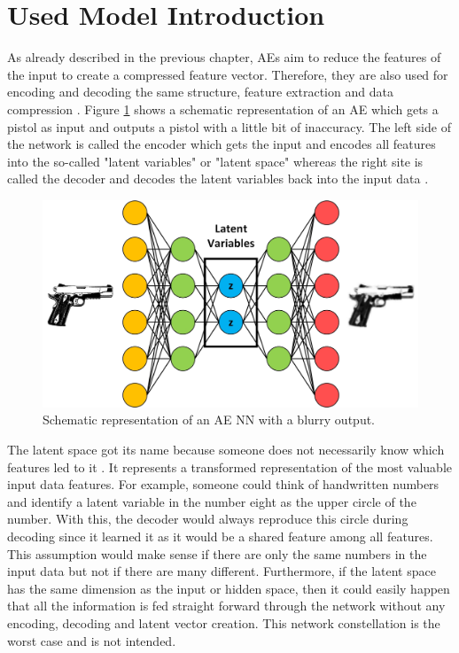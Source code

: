 \documentclass[MGS,Master,english]{twbook}%
\begin{document}
\section{Used Model Introduction}
As already described in the previous chapter, \acp{AE} aim to reduce the features of the input to create a compressed feature vector. Therefore, they are also used for encoding and decoding the same structure, feature extraction and data compression \cite{ml::book::nnProgrammingTF}. Figure \ref{fig::autoencoder} shows a schematic representation of an \ac{AE} which gets a pistol as input and outputs a pistol with a little bit of inaccuracy. The left side of the network is called the encoder which gets the input and encodes all features into the so-called "latent variables" or "latent space" whereas the right site is called the decoder and decodes the latent variables back into the input data \cite{ml::book::nnProgrammingTF}. 
\begin{figure}[!htbp]
	\centering
	\includegraphics[width=0.9\linewidth]{PICs/NNs/autoencoder}
	\caption{Schematic representation of an \ac{AE} \ac{NN} with a blurry output.} \label{fig::autoencoder}
\end{figure}

The latent space got its name because someone does not necessarily know which features led to it \cite{ml::vae::tutorial}. It represents a transformed representation of the most valuable input data features. For example, someone could think of handwritten numbers and identify a latent variable in the number eight as the upper circle of the number. With this, the decoder would always reproduce this circle during decoding since it learned it as it would be a shared feature among all features. This assumption would make sense if there are only the same numbers in the input data but not if there are many different. Furthermore, if the latent space has the same dimension as the input or hidden space, then it could easily happen that all the information is fed straight forward through the network without any encoding, decoding and latent vector creation. This network constellation is the worst case and is not intended.
\end{document}
